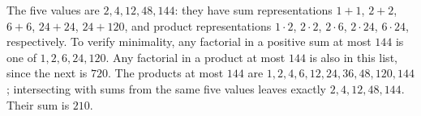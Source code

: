 The five values are $2,4,12,48,144$: they have sum representations $1+1$, $2+2$, $6+6$, $24+24$, $24+120$, and product representations $1\cdot2$, $2\cdot2$, $2\cdot6$, $2\cdot24$, $6\cdot24$, respectively. To verify minimality, any factorial in a positive sum at most $144$ is one of $1,2,6,24,120$. Any factorial in a product at most $144$ is also in this list, since the next is $720$. The products at most $144$ are $1,2,4,6,12,24,36,48,120,144$; intersecting with sums from the same five values leaves exactly $2,4,12,48,144$. Their sum is $\boxed{210}$.
